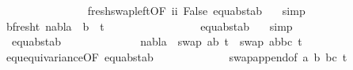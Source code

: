 \begin{isabellebody}
\ \ \ \ \ \ \ \ \ \ \ \ \ \ \isamarkupfalse%
\ fresh{\isacharunderscore}{\kern0pt}swap{\isacharunderscore}{\kern0pt}left{\isacharbrackleft}{\kern0pt}OF\ ii{\isacharbrackright}{\kern0pt}\ False\ equ{\isacharunderscore}{\kern0pt}abst{\isacharunderscore}{\kern0pt}ab\ {}\ \isamarkupfalse%
\ simp\isanewline
\ \ \ \ \ \ \ \ \ \ \ \ \isamarkupfalse%
\ b{\isacharunderscore}{\kern0pt}fresh{\isacharunderscore}{\kern0pt}t{}{\isacharcolon}{\kern0pt}\ {\isachardoublequoteopen}nabla\ {\isasymturnstile}\ b\ {\isasymsharp}\ t{}{\isacharprime}{\kern0pt}{\isachardoublequoteclose}\ \isanewline
\ \ \ \ \ \ \ \ \ \ \ \ \ \ \isamarkupfalse%
\ equ{\isacharunderscore}{\kern0pt}abst{\isacharunderscore}{\kern0pt}ab{\isacharparenleft}{\kern0pt}{}{\isacharparenright}{\kern0pt}\ {}{\isacharparenleft}{\kern0pt}{}{\isacharparenright}{\kern0pt}\ \isamarkupfalse%
\ simp\isanewline
\isanewline
\ \ \ \ \ \ \ \ \ \ \ \ \isamarkupfalse%
\ {}{\isacharparenleft}{\kern0pt}{}{\isacharparenright}{\kern0pt}\ equ{\isacharunderscore}{\kern0pt}abst{\isacharunderscore}{\kern0pt}ab{\isacharparenleft}{\kern0pt}{}{\isacharparenright}{\kern0pt}\isanewline
\ \ \ \ \ \ \ \ \ \ \ \ \isamarkupfalse%
\ {\isachardoublequoteopen}nabla\ {\isasymturnstile}\ swap\ {\isacharbrackleft}{\kern0pt}{\isacharparenleft}{\kern0pt}a{\isacharcomma}{\kern0pt}b{\isacharparenright}{\kern0pt}{\isacharbrackright}{\kern0pt}\ t{}{\isacharprime}{\kern0pt}\ {\isasymapprox}\ swap\ {\isacharparenleft}{\kern0pt}{\isacharbrackleft}{\kern0pt}{\isacharparenleft}{\kern0pt}a{\isacharcomma}{\kern0pt}b{\isacharparenright}{\kern0pt}{\isacharbrackright}{\kern0pt}{\isacharat}{\kern0pt}{\isacharbrackleft}{\kern0pt}{\isacharparenleft}{\kern0pt}b{\isacharcomma}{\kern0pt}c{\isacharparenright}{\kern0pt}{\isacharbrackright}{\kern0pt}{\isacharparenright}{\kern0pt}\ t{}{\isacharprime}{\kern0pt}{\isachardoublequoteclose}\isanewline
\ \ \ \ \ \ \ \ \ \ \ \ \ \ \isamarkupfalse%
\ equ{\isacharunderscore}{\kern0pt}equivariance{\isacharbrackleft}{\kern0pt}OF\ equ{\isacharunderscore}{\kern0pt}abst{\isacharunderscore}{\kern0pt}ab{\isacharparenleft}{\kern0pt}{}{\isacharparenright}{\kern0pt}{\isacharbrackright}{\kern0pt}\isanewline
\ \ \ \ \ \ \ \ \ \ \ \ \ swap{\isacharunderscore}{\kern0pt}append{\isacharbrackleft}{\kern0pt}of\ {\isacartoucheopen}{\isacharbrackleft}{\kern0pt}{\isacharparenleft}{\kern0pt}a{\isacharcomma}{\kern0pt}\ b{\isacharparenright}{\kern0pt}{\isacharbrackright}{\kern0pt}{\isacartoucheclose}\ {\isacartoucheopen}{\isacharbrackleft}{\kern0pt}{\isacharparenleft}{\kern0pt}b{\isacharcomma}{\kern0pt}c{\isacharparenright}{\kern0pt}{\isacharbrackright}{\kern0pt}{\isacartoucheclose}\ t{}{\isacharprime}{\kern0pt}{\isacharbrackright}{\kern0pt}\ \isamarkupfalse%

\end{isabellebody}
